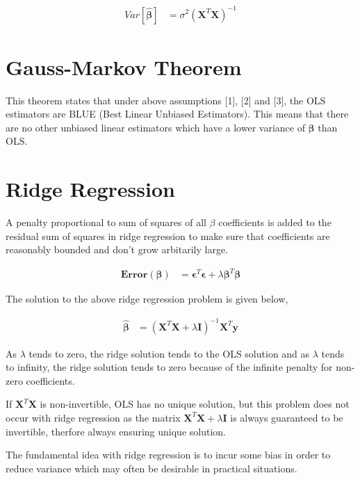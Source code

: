 \documentclass[11pt, a4paper]{article}
\begin{document}
\begin{align*}
	Var[\boldsymbol{\hat{\beta}}] & = \sigma^2 (\mathbf{X}^T\mathbf{X})^{-1} 
\end{align*}

\section{Gauss-Markov Theorem}

This theorem states that under above assumptions [1], [2] and [3], the OLS estimators are BLUE (Best Linear Unbiased Estimators). This means that there are no other unbiased linear estimators which have a lower variance of $\boldsymbol{\beta}$ than OLS.  

\section{Ridge Regression}

A penalty proportional to sum of squares of all $\beta$ coefficients is added to the residual sum of squares in ridge regression to make sure that coefficients are reasonably bounded and don't grow arbitarily large.

\begin{align*}
	\mathbf{Error}(\boldsymbol{\beta}) & = \boldsymbol{\epsilon}^T\boldsymbol{\epsilon} + \lambda\boldsymbol{\beta}^T\boldsymbol{\beta} 
\end{align*}

The solution to the above ridge regression problem is given below,


\begin{align*}
	\boldsymbol{\hat{\beta}} & = (\mathbf{X}^T\mathbf{X} + \lambda\mathbf{I})^{-1}\mathbf{X}^T\mathbf{y} 
\end{align*}

As $\lambda$ tends to zero, the ridge solution tends to the OLS solution and as $\lambda$ tends to infinity, the ridge solution tends to zero because of the infinite penalty for non-zero coefficients.

If $\mathbf{X}^T\mathbf{X}$ is non-invertible, OLS has no unique solution, but this problem does not occur with ridge regression as the matrix $\mathbf{X}^T\mathbf{X} + \lambda\mathbf{I}$ is always guaranteed to be invertible, therfore always ensuring unique solution.

The fundamental idea with ridge regression is to incur some bias in order to reduce variance which may often be desirable in practical situations.
\end{document}
